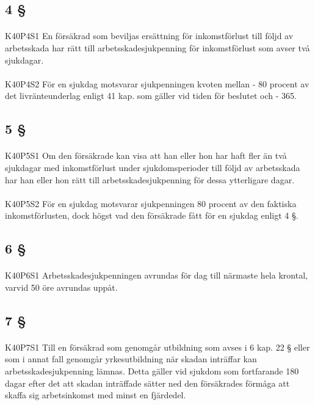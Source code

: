 \documentclass[a4paper,notitlepage,openany,10pt]{book}
\begin{document}
\subsection*{4 §}
\paragraph*{}
{\tiny K40P4S1}
En försäkrad som beviljas ersättning för inkomstförlust till följd av arbetsskada har rätt till arbetsskadesjukpenning för inkomstförlust som avser två sjukdagar.
\paragraph*{}
{\tiny K40P4S2}
För en sjukdag motsvarar sjukpenningen kvoten mellan
\newline - 80 procent av det livränteunderlag enligt 41 kap. som gäller vid tiden för beslutet och
\newline - 365.
\subsection*{5 §}
\paragraph*{}
{\tiny K40P5S1}
Om den försäkrade kan visa att han eller hon har haft fler än två sjukdagar med inkomstförlust under sjukdomsperioder till följd av arbetsskada har han eller hon rätt till arbetsskadesjukpenning för dessa ytterligare dagar.
\paragraph*{}
{\tiny K40P5S2}
För en sjukdag motsvarar sjukpenningen 80 procent av den faktiska inkomstförlusten, dock högst vad den försäkrade fått för en sjukdag enligt 4 §.
\subsection*{6 §}
\paragraph*{}
{\tiny K40P6S1}
Arbetsskadesjukpenningen avrundas för dag till närmaste hela krontal, varvid 50 öre avrundas uppåt.
\subsection*{7 §}
\paragraph*{}
{\tiny K40P7S1}
Till en försäkrad som genomgår utbildning som avses i 6 kap. 22 § eller som i annat fall genomgår yrkesutbildning när skadan inträffar kan arbetsskadesjukpenning lämnas. Detta gäller vid sjukdom som fortfarande 180 dagar efter det att skadan inträffade sätter ned den försäkrades förmåga att skaffa sig arbetsinkomst med minst en fjärdedel.
\end{document}
